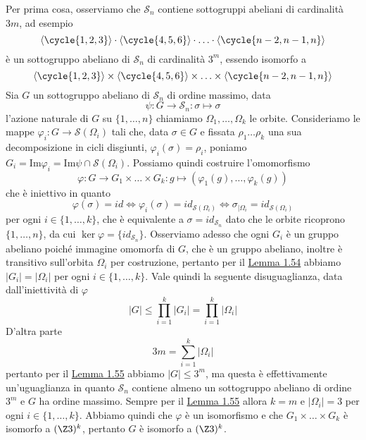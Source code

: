 \documentclass[11pt]{scrartcl}
\begin{document}
	\begin{soln}
		Per prima cosa, osserviamo che $\mathcal{S}_n$ contiene sottogruppi abeliani di
		cardinalità $3m$, ad esempio
		\[
		\langle\cycle{1, 2, 3}\rangle\cdot \langle\cycle{4, 5, 6}\rangle
		\cdot \ldots \cdot \langle\cycle{n - 2, n - 1, n}\rangle
		\]
		è un sottogruppo abeliano di $\mathcal{S}_n$ di cardinalità $3^m$, essendo 
		isomorfo a
		\[
		\langle\cycle{1, 2, 3}\rangle\times\langle\cycle{4, 5, 6}\rangle
		\times\ldots\times\langle\cycle{n - 2, n - 1, n}\rangle
		\]
		Sia $G$ un sottogruppo abeliano di $\mathcal{S}_n$ di ordine massimo, data
		\[
		\psi: G\longrightarrow \mathcal{S}_n : \sigma \longmapsto \sigma
		\]
		l'azione naturale di $G$ su $\{1, \ldots, n\}$ chiamiamo $\Omega_1, \ldots, \Omega_k$
		le orbite. Consideriamo le mappe $\varphi_i : G \longrightarrow \mathcal{S}(\Omega_i)$
		tali che, data $\sigma \in G$ e fissata $\rho_1\ldots\rho_k$ una sua decomposizione
		in cicli disgiunti, $\varphi_i(\sigma) = \rho_i$, poniamo $G_i = \mathrm{Im}\varphi_i=
		\mathrm{Im}\psi \cap \mathcal{S}(\Omega_i)$. Possiamo quindi costruire l'omomorfismo
		\[
		\varphi: G \longrightarrow G_1\times \ldots \times G_k : g \longmapsto (\varphi_1(g), \ldots, \varphi_k(g))
		\]
		che è iniettivo in quanto 
		\[
		\varphi(\sigma) = id \iff \varphi_i(\sigma) = id_{\mathcal{S}(\Omega_i)} \iff 
		\sigma_{\mid \Omega_i} = id_{\mathcal{S}(\Omega_i)}
		\]
		per ogni $i \in \{1, \ldots, k\}$, che è equivalente a $\sigma = id_{\mathcal{S}_n}$
		dato che le orbite ricoprono $\{1, \ldots, n\}$, da cui $\ker\varphi = 
		\{id_{\mathcal{S}_n}\}$. Osserviamo adesso che ogni $G_i$ è un gruppo abeliano poiché
		immagine omomorfa di $G$, che è un gruppo abeliano, inoltre è transitivo
		sull'orbita $\Omega_i$ per costruzione, pertanto per il 
		\hyperref[lemma1.54]{Lemma 1.54} abbiamo $|G_i| = |\Omega_i|$ per ogni 
		$i \in \{1, \ldots, k\}$. Vale quindi la seguente disuguaglianza, data
		dall'iniettività di $\varphi$
		\[
		|G| \leqslant \prod_{i = 1}^k|G_i| = \prod_{i = 1}^k |\Omega_i|
		\]
		D'altra parte
		\[
		3m = \sum_{i = 1}^k|\Omega_i|
		\]pertanto per il \hyperref[lemma1.55]{Lemma 1.55} abbiamo $|G| \leq 3^m$, 
		ma questa è effettivamente un'uguaglianza in quanto $\mathcal{S}_n$ contiene
		almeno un sottogruppo abeliano di ordine $3^m$ e $G$ ha ordine massimo.
		Sempre per il \hyperref[lemma1.55]{Lemma 1.55} allora $k = m$ e $|\Omega_i| = 3$
		per ogni $i \in \{1, \ldots, k\}$. Abbiamo quindi che $\varphi$ è un isomorfismo
		e che $G_1\times\ldots\times G_k$ è isomorfo a $(\Z3)^k$, pertanto
		$G$ è isomorfo a $(\Z3)^k$.
	\end{soln}
	
\end{document}
